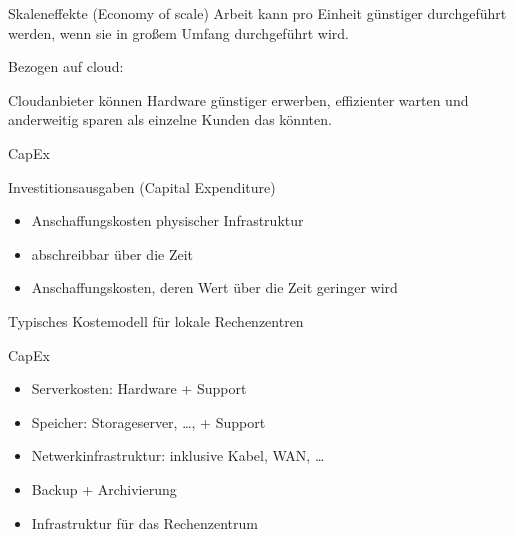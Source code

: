 \begin{flashcard}[Definition]{Skaleneffekte (Economy of scale)}
    Arbeit kann pro Einheit günstiger durchgeführt werden, wenn sie in großem Umfang durchgeführt wird.

    \vspace{5mm}
    Bezogen auf cloud:

    Cloudanbieter können Hardware günstiger erwerben, effizienter warten und anderweitig sparen als einzelne Kunden das könnten.
\end{flashcard}

\begin{flashcard}[Definition]{CapEx}

    Investitionsausgaben (Capital Expenditure)
    \begin{itemize}
        \item Anschaffungskosten physischer Infrastruktur
        \item abschreibbar über die Zeit
        \item Anschaffungskosten, deren Wert über die Zeit geringer wird
    \end{itemize}

    Typisches Kostemodell für lokale Rechenzentren

\end{flashcard}

\begin{flashcard}[Beispiele]{CapEx}
    \begin{itemize}
        \item Serverkosten: Hardware + Support
        \item Speicher: Storageserver, \ldots, + Support
        \item Netwerkinfrastruktur: inklusive Kabel, WAN, \ldots
        \item Backup + Archivierung
        \item Infrastruktur für das Rechenzentrum
    \end{itemize}
\end{flashcard}

